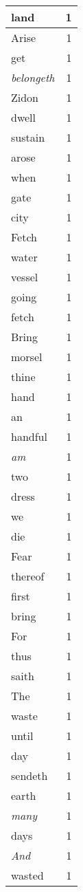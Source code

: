 \begin{center}
\begin{longtable}{l|r}
land & 1\\ \hline 
Arise & 1\\ \hline 
get & 1\\ \hline 
\emph{belongeth} & 1\\ \hline 
Zidon & 1\\ \hline 
dwell & 1\\ \hline 
sustain & 1\\ \hline 
arose & 1\\ \hline 
when & 1\\ \hline 
gate & 1\\ \hline 
city & 1\\ \hline 
Fetch & 1\\ \hline 
water & 1\\ \hline 
vessel & 1\\ \hline 
going & 1\\ \hline 
fetch & 1\\ \hline 
Bring & 1\\ \hline 
morsel & 1\\ \hline 
thine & 1\\ \hline 
hand & 1\\ \hline 
an & 1\\ \hline 
handful & 1\\ \hline 
\emph{am} & 1\\ \hline 
two & 1\\ \hline 
dress & 1\\ \hline 
we & 1\\ \hline 
die & 1\\ \hline 
Fear & 1\\ \hline 
thereof & 1\\ \hline 
first & 1\\ \hline 
bring & 1\\ \hline 
For & 1\\ \hline 
thus & 1\\ \hline 
saith & 1\\ \hline 
The & 1\\ \hline 
waste & 1\\ \hline 
until & 1\\ \hline 
day & 1\\ \hline 
sendeth & 1\\ \hline 
earth & 1\\ \hline 
\emph{many} & 1\\ \hline 
days & 1\\ \hline 
\emph{And} & 1\\ \hline 
wasted & 1\\ \hline 

\end{longtable}
\end{center}
